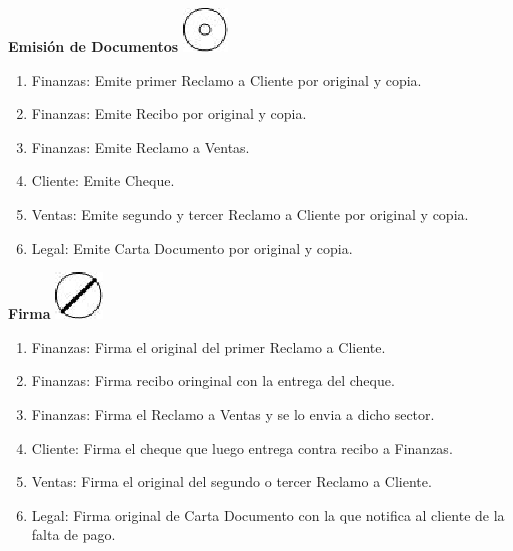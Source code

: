 \begin{center}
  \textbf{Emisión de Documentos}
  \includegraphics{./Images/Simbolos/simbolo-Emision-de-Documentos.png}
\end{center}
\begin{enumerate}
\item Finanzas: Emite primer Reclamo a Cliente por original y copia.
\item Finanzas: Emite Recibo por original y copia.
\item Finanzas: Emite Reclamo a Ventas.
\item Cliente: Emite Cheque.
\item Ventas: Emite segundo y tercer Reclamo a Cliente por original y copia.
\item Legal: Emite Carta Documento por original y copia.
\end{enumerate}

\begin{center}
  \textbf{Firma}
  \includegraphics{./Images/Simbolos/simbolo-Firma.png}
\end{center}
\begin{enumerate}
\item Finanzas: Firma el original del primer Reclamo a Cliente.
\item Finanzas: Firma recibo oringinal con la entrega del cheque.
\item Finanzas: Firma el Reclamo a Ventas y se lo envia a dicho sector.
\item Cliente: Firma el cheque que luego entrega contra recibo a Finanzas.
\item Ventas: Firma el original del segundo o tercer Reclamo a Cliente.
\item Legal: Firma original de Carta Documento con la que notifica al cliente de la falta de pago.
\end{enumerate}

